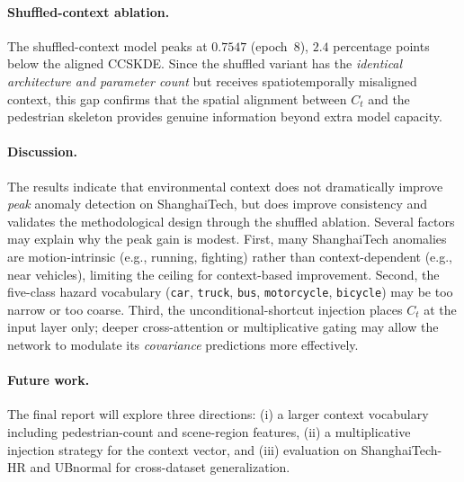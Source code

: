 \documentclass{article}
\begin{document}
\paragraph{Shuffled-context ablation.}
The shuffled-context model peaks at $0.7547$ (epoch~8), $2.4$
percentage points below the aligned CCSKDE. Since the shuffled
variant has the \emph{identical architecture and parameter count}
but receives spatiotemporally misaligned context, this gap confirms
that the spatial alignment between $C_t$ and the pedestrian skeleton
provides genuine information beyond extra model capacity.

\paragraph{Discussion.}
The results indicate that environmental context does not dramatically
improve \emph{peak} anomaly detection on ShanghaiTech, but does
improve consistency and validates the methodological design through
the shuffled ablation. Several factors may explain why the peak gain
is modest. First, many ShanghaiTech anomalies are motion-intrinsic
(e.g., running, fighting) rather than context-dependent (e.g., near
vehicles), limiting the ceiling for context-based improvement.
Second, the five-class hazard vocabulary
(\texttt{car}, \texttt{truck}, \texttt{bus}, \texttt{motorcycle},
\texttt{bicycle}) may be too narrow or too coarse.
Third, the unconditional-shortcut injection places $C_t$ at the
input layer only; deeper cross-attention or multiplicative gating
may allow the network to modulate its \emph{covariance} predictions
more effectively.

\paragraph{Future work.}
The final report will explore three directions: (i) a larger context
vocabulary including pedestrian-count and scene-region features,
(ii) a multiplicative injection strategy for the context vector,
and (iii) evaluation on ShanghaiTech-HR and UBnormal for
cross-dataset generalization.
\end{document}
